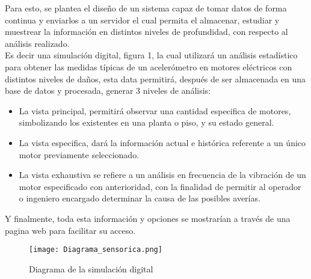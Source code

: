 

Para esto, se plantea el diseño de un sistema capaz de tomar datos de forma continua y enviarlos a un servidor el cual permita el almacenar, estudiar y muestrear la información en distintos niveles de profundidad, con respecto al análisis realizado.\\
Es decir una simulación digital, figura 1, la cual utilizará un análisis estadístico para obtener las medidas típicas de un acelerómetro en motores eléctricos con distintos niveles de daños, esta data permitirá, después de ser almacenada en una base de datos y procesada, generar 3 niveles de análisis:\\
\begin{itemize}
\item La vista principal, permitirá observar una cantidad especifica de motores, simbolizando los existentes en una planta o piso, y su estado general.

\item La vista especifica, dará la información actual e histórica referente a un único motor previamente seleccionado.

\item La vista exhaustiva se refiere a un análisis en frecuencia de la vibración de un motor especificado con anterioridad, con la finalidad de permitir al operador o ingeniero encargado determinar la causa de las posibles averías.
\end{itemize}


Y finalmente, toda esta información y opciones se mostrarían a través de una pagina web para facilitar su acceso.

\begin{figure}[htb]
\centering
\caption{Diagrama de la simulación digital}
\label{fig:diagrama}
\texttt{[image: Diagrama\_sensorica.png]}
\end{figure}


